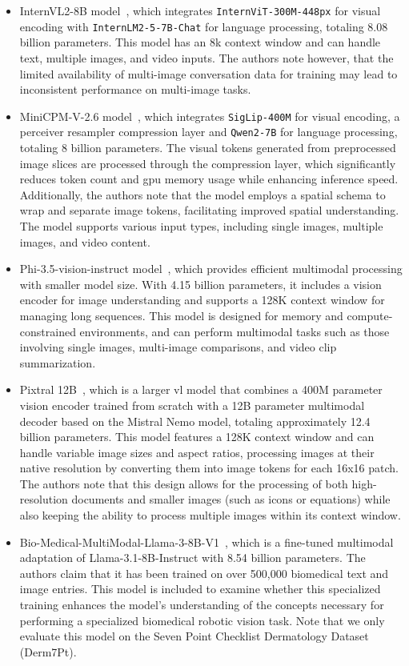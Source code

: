 \documentclass[../ShajiS_RnDReport.tex]{subfiles}
\begin{document}
\begin{itemize}
    \item InternVL2-8B model~\cite{Chen2023}, which integrates \texttt{InternViT-300M-448px} for visual encoding with \texttt{InternLM2-5-7B-Chat} for language processing, totaling 8.08 billion parameters. This model has an 8k context window and can handle text, multiple images, and video inputs. The authors note however, that the limited availability of multi-image conversation data for training may lead to inconsistent performance on multi-image tasks.

    \item MiniCPM-V-2.6 model~\cite{Yao2024}, which integrates \texttt{SigLip-400M} for visual encoding, a perceiver resampler compression layer and \texttt{Qwen2-7B} for language processing, totaling 8 billion parameters. The visual tokens generated from preprocessed image slices are processed through the compression layer, which significantly reduces token count and \gls{gpu} memory usage while enhancing inference speed. Additionally, the authors note that the model employs a spatial schema to wrap and separate image tokens, facilitating improved spatial understanding. The model supports various input types, including single images, multiple images, and video content.
    
    \item Phi-3.5-vision-instruct model~\cite{Abdin2024}, which provides efficient multimodal processing with smaller model size. With 4.15 billion parameters, it includes a vision encoder for image understanding and supports a 128K context window for managing long sequences. This model is designed for memory and compute-constrained environments, and can perform multimodal tasks such as those involving single images, multi-image comparisons, and video clip summarization.

    \item Pixtral 12B~\cite{Agrawal2024}, which is a larger \gls{vl} model that combines a 400M parameter vision encoder trained from scratch with a 12B parameter multimodal decoder based on the Mistral Nemo model, totaling approximately 12.4 billion parameters. This model features a 128K context window and can handle variable image sizes and aspect ratios, processing images at their native resolution by converting them into image tokens for each 16x16 patch. The authors note that this design allows for the processing of both high-resolution documents and smaller images (such as icons or equations) while also keeping the ability to process multiple images within its context window.

    \item Bio-Medical-MultiModal-Llama-3-8B-V1~\cite{ContactDoctor2024}, which is a fine-tuned multimodal adaptation of Llama-3.1-8B-Instruct with 8.54 billion parameters. The authors claim that it has been trained on over 500,000 biomedical text and image entries. This model is included to examine whether this specialized training enhances the model's understanding of the concepts necessary for performing a specialized biomedical robotic vision task. Note that we only evaluate this model on the Seven Point Checklist Dermatology Dataset (Derm7Pt).
\end{itemize}
\end{document}
